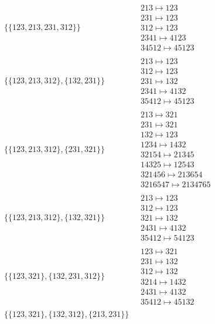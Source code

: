 \begin{scriptsize}
\begin{align}
\begin{matrix}
\end{matrix}
\\
\{\{123, 213, 231, 312\}\}
\ 
&
\begin{matrix}
213 \mapsto 123\\231 \mapsto 123\\312 \mapsto 123\\2341 \mapsto 4123\\34512 \mapsto 45123
\end{matrix}
\\
\{\{123, 213, 312\}, \{132, 231\}\}
\ 
&
\begin{matrix}
213 \mapsto 123\\312 \mapsto 123\\231 \mapsto 132\\2341 \mapsto 4132\\35412 \mapsto 45123
\end{matrix}
\\
\{\{123, 213, 312\}, \{231, 321\}\}
\ 
&
\begin{matrix}
213 \mapsto 321\\231 \mapsto 321\\132 \mapsto 123\\1234 \mapsto 1432\\32154 \mapsto 21345\\14325 \mapsto 12543\\321456 \mapsto 213654\\3216547 \mapsto 2134765
\end{matrix}
\\
\{\{123, 213, 312\}, \{132, 321\}\}
\ 
&
\begin{matrix}
213 \mapsto 123\\312 \mapsto 123\\321 \mapsto 132\\2431 \mapsto 4132\\35412 \mapsto 54123
\end{matrix}
\\
\{\{123, 321\}, \{132, 231, 312\}\}
\ 
&
\begin{matrix}
123 \mapsto 321\\231 \mapsto 132\\312 \mapsto 132\\3214 \mapsto 1432\\2431 \mapsto 4132\\35412 \mapsto 45132
\end{matrix}
\\
\{\{123, 321\}, \{132, 312\}, \{213, 231\}\}
\ 
&
\begin{matrix}

\end{matrix}
\end{align}
\end{scriptsize}
